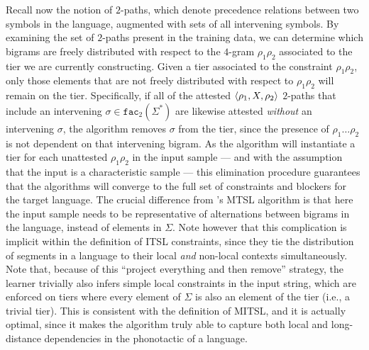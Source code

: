 \documentclass[11pt,a4paper]{article}
\newcommand{\facn}[1]{\ensuremath{\texttt{fac}_{#1}}}
\begin{document}
Recall now the notion of $2$-paths, which denote precedence relations between two symbols in the language, augmented with sets of all intervening symbols.
By examining the set of $2$-paths present in the training data, we can determine which bigrams are freely distributed with respect to the $4$-gram $\rho_1\rho_2$ associated to the tier we are currently constructing. 
Given a tier associated to the constraint  $\rho_1\rho_2$, only those elements that are not freely distributed with respect to  $\rho_1\rho_2$ will remain on the tier.
  Specifically, if all of the attested $\langle{\rho_1, X, \rho_2}\rangle$ $2$-paths that include an intervening $\sigma \in \facn{2}(\Sigma^*)$ are likewise attested \emph{without} an intervening $\sigma$, the algorithm removes $\sigma$ from the tier, since the presence of $\rho_1\ldots{}\rho_2$ is not dependent on that intervening bigram.
As the algorithm will instantiate a tier for each unattested   $\rho_1\rho_2$ in the input sample --- and  with the assumption that the input is a characteristic sample  --- this elimination procedure guarantees that the algorithms will converge to the full set of constraints and blockers for the target language.
  The crucial difference from \citet{McMullinSCIL2019}'s MTSL algorithm is that here the input sample needs to be representative of alternations between bigrams in the language, instead of elements in $\Sigma$.
  Note however that this complication is implicit within the definition of ITSL constraints, since they tie the distribution of segments in a language to their local \emph{and} non-local contexts simultaneously.
  Note that, because of this ``project everything and then remove'' strategy, the learner trivially also infers simple local constraints in the input string, which are enforced on tiers where every element of $\Sigma$ is also an element of the tier (i.e., a trivial tier).
  This is consistent with the definition of MITSL, and it is actually optimal, since it makes the algorithm truly able to capture both local and long-distance dependencies in the phonotactic of a language.
  
\end{document}
